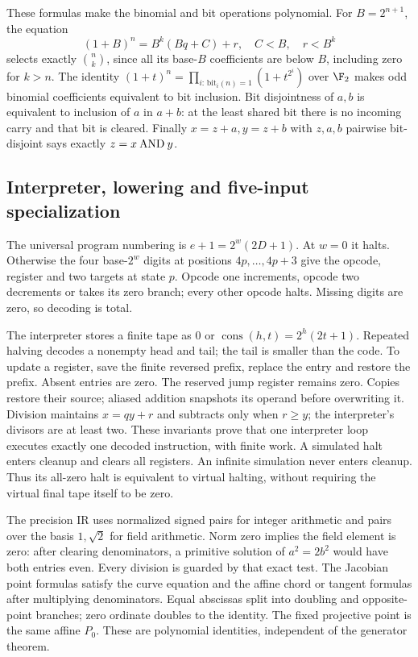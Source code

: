 These formulas make the binomial and bit operations polynomial.
For $B=2^{n+1}$, the equation
\[
 (1+B)^n=B^k(Bq+C)+r,\quad C<B,\quad r<B^k
\]
selects exactly $\binom nk$, since all its base-$B$ coefficients
are below $B$, including zero for $k>n$.
The identity
$(1+t)^n=\prod_{i:\,\text{bit}_i(n)=1}(1+t^{2^i})$ over $\F_2$
makes odd binomial coefficients equivalent to bit inclusion.
Bit disjointness of $a,b$ is equivalent to inclusion of $a$ in $a+b$:
at the least shared bit there is no incoming carry and that bit
is cleared. Finally $x=z+a,y=z+b$ with $z,a,b$ pairwise bit-disjoint
says exactly $z=x\mathbin{\rm AND}y$.

\subsection{Interpreter, lowering and five-input specialization}
The universal program numbering is $e+1=2^w(2D+1)$.
At $w=0$ it halts. Otherwise the four base-$2^w$ digits at positions
$4p,\ldots,4p+3$ give the opcode, register and two targets at state $p$.
Opcode one increments, opcode two decrements or takes its zero branch;
every other opcode halts. Missing digits are zero, so decoding is total.

The interpreter stores a finite tape as
$0$ or $\operatorname{cons}(h,t)=2^h(2t+1)$.
Repeated halving decodes a nonempty head and tail; the tail is smaller
than the code. To update a register, save the finite reversed prefix,
replace the entry and restore the prefix. Absent entries are zero.
The reserved jump register remains zero. Copies restore their source;
aliased addition snapshots its operand before overwriting it.
Division maintains $x=qy+r$ and subtracts only when $r\ge y$;
the interpreter's divisors are at least two.
These invariants prove that one interpreter loop executes exactly one
decoded instruction, with finite work. A simulated halt enters cleanup
and clears all registers. An infinite simulation never enters cleanup.
Thus its all-zero halt is equivalent to virtual halting, without
requiring the virtual final tape itself to be zero.

The precision IR uses normalized signed pairs for integer arithmetic
and pairs over the basis $1,\sqrt2$ for field arithmetic.
Norm zero implies the field element is zero: after clearing
denominators, a primitive solution of $a^2=2b^2$ would have both
entries even. Every division is guarded by that exact test.
The Jacobian point formulas satisfy the curve equation and the affine
chord or tangent formulas after multiplying denominators.
Equal abscissas split into doubling and opposite-point branches;
zero ordinate doubles to the identity. The fixed projective point
is the same affine $P_0$. These are polynomial identities, independent
of the generator theorem.


